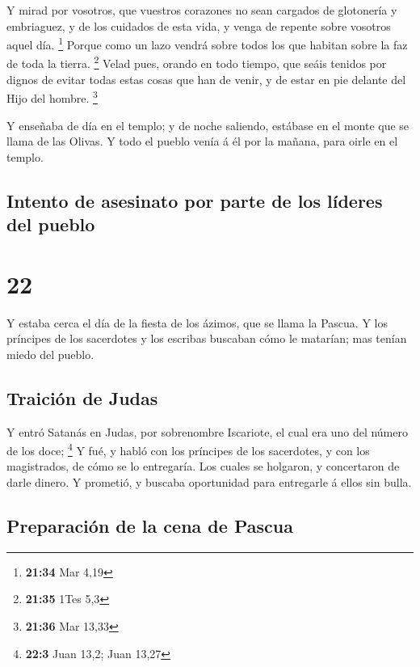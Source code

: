  Y mirad por vosotros, que vuestros corazones no sean
cargados de glotonería y embriaguez, y de los cuidados de esta vida, y
venga de repente sobre vosotros aquel día. \footnote{\textbf{21:34} Mar
  4,19}  Porque como un lazo vendrá sobre todos los que
habitan sobre la faz de toda la tierra. \footnote{\textbf{21:35} 1Tes
  5,3}  Velad pues, orando en todo tiempo, que seáis
tenidos por dignos de evitar todas estas cosas que han de venir, y de
estar en pie delante del Hijo del hombre. \footnote{\textbf{21:36} Mar
  13,33}

 Y enseñaba de día en el templo; y de noche saliendo,
estábase en el monte que se llama de las Olivas.  Y todo el
pueblo venía á él por la mañana, para oirle en el templo.

\hypertarget{intento-de-asesinato-por-parte-de-los-luxedderes-del-pueblo}{%
\subsection{Intento de asesinato por parte de los líderes del
pueblo}\label{intento-de-asesinato-por-parte-de-los-luxedderes-del-pueblo}}

\hypertarget{section-21}{%
\section{22}\label{section-21}}

 Y estaba cerca el día de la fiesta de los ázimos, que se
llama la Pascua.  Y los príncipes de los sacerdotes y los
escribas buscaban cómo le matarían; mas tenían miedo del pueblo.

\hypertarget{traiciuxf3n-de-judas}{%
\subsection{Traición de Judas}\label{traiciuxf3n-de-judas}}

 Y entró Satanás en Judas, por sobrenombre Iscariote, el
cual era uno del número de los doce; \footnote{\textbf{22:3} Juan 13,2;
  Juan 13,27}  Y fué, y habló con los príncipes de los
sacerdotes, y con los magistrados, de cómo se lo entregaría.
 Los cuales se holgaron, y concertaron de darle dinero.
 Y prometió, y buscaba oportunidad para entregarle á ellos
sin bulla.

\hypertarget{preparaciuxf3n-de-la-cena-de-pascua}{%
\subsection{Preparación de la cena de
Pascua}\label{preparaciuxf3n-de-la-cena-de-pascua}}


